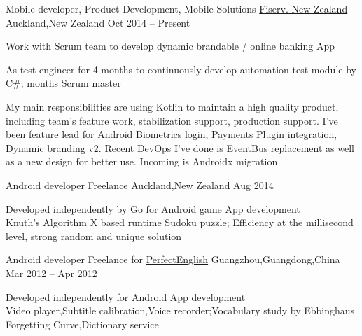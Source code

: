 
\begin{cventries}
	\cventry
	{Mobile developer, Product Development, Mobile Solutions}
	{\href{https://www.careers.fiserv.com/new-zealand}{Fiserv. New Zealand}}
	{Auckland,\enskip New Zealand}
	{Oct 2014 – Present}
	{
		\begin{cvitems}
			\item {Work with Scrum team to develop dynamic brandable \href{https://play.google.com/store/apps/details?id=com.fiserv.touchbankingasp&hl=en}{\color{deepblue}{Android}}/\href{https://itunes.apple.com/us/app/touchbanking/id386678211?mt=8}{\color{deepblue}{iPhone}} online banking App}
			\item {As test engineer for 4 months to continuously develop automation test module by C\#; months Scrum master}
			\item {My main responsibilities are using Kotlin to maintain a high quality product, including team's feature work, stabilization support,  production support.  I've been feature lead for Android Biometrics login, Payments Plugin integration, Dynamic branding v2. Recent DevOps I've done is EventBus replacement as well as a new design for better use. Incoming is Androidx migration}
		\end{cvitems}
	}
\end{cventries}

\begin{cventries}
	\cventry
	{Android developer}
	{Freelance}
	{Auckland,\enskip New Zealand}
	{Aug 2014}
	{
		\begin{cvitems}
			\item {Developed independently by Go for Android \href{https://play.google.com/store/apps/details?id=com.gmail.jiangyang5157.sudoku}{\color{deepblue}{Sudoku}} game App development\\
			Knuth's Algorithm X based runtime Sudoku puzzle;\enskip
			Efficiency at the millisecond level, strong random and unique solution}
		\end{cvitems}
	}
\end{cventries}

\begin{cventries}
	\cventry
	{Android developer}
	{Freelance for \href{http://www.english119.cn}{PerfectEnglish}}
	{Guangzhou,\enskip Guangdong,\enskip China}
	{Mar 2012 – Apr 2012}
	{
		\begin{cvitems}
			\item {Developed independently for Android \href{http://shouji.baidu.com/software/11415668.html}{\color{deepblue}{PerfectEnglish}} App development\\
			Video player,\enskip Subtitle calibration,\enskip Voice recorder;\enskip Vocabulary study by Ebbinghaus Forgetting Curve,\enskip Dictionary service}
		\end{cvitems}
	}
\end{cventries}

